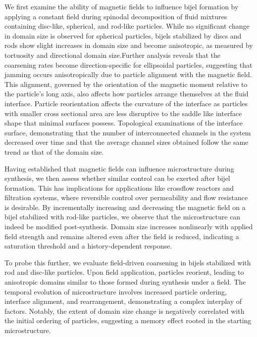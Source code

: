 \begin{front}
    We first examine the ability of magnetic fields to influence bijel formation by applying a constant field during spinodal decomposition 
    of fluid mixtures containing disc-like, spherical, and rod-like particles. While no significant change in domain size is observed for 
    spherical particles, bijels stabilized by discs and rods show slight increases in domain size and become anisotropic, as measured by 
    tortuosity and directional domain size.Further analysis reveals that the coarsening rates become direction-specific for ellipsoidal particles, 
    suggesting that jamming occurs anisotropically due to particle alignment with the magnetic field. This alignment, governed by the 
    orientation of the magnetic moment relative to the particle's long axis, also affects how particles arrange themselves at the fluid 
    interface. Particle reorientation affects the curvature of the interface as particles with smaller cross sectional area are less disruptive
    to the saddle like interface shape that minimal surfaces possess. Topological examinations of the interface surface, 
    demonstrating that the number of interconnected channels in the system decreased over time and that the average channel sizes obtained follow
    the same trend as that of the domain size.
    
    Having established that magnetic fields can influence microstructure during synthesis, we then assess whether similar control can be exerted 
    after bijel formation. This has implications for applications like crossflow reactors and filtration systems, where reversible control over 
    permeability and flow resistance is desirable. By incrementally increasing and decreasing the magnetic field on a bijel stabilized with 
    rod-like particles, we observe that the microstructure can indeed be modified post-synthesis. Domain size increases nonlinearly with 
    applied field strength and remains altered even after the field is reduced, indicating a saturation threshold and a history-dependent 
    response.
    
    To probe this further, we evaluate field-driven coarsening in bijels stabilized with rod and disc-like particles. Upon field application, 
    particles reorient, leading to anisotropic domains similar to those formed during synthesis under a field. The temporal evolution of 
    microstructure involves increased particle ordering, interface alignment, and rearrangement, demonstrating a complex interplay of factors. 
    Notably, the extent of domain size change is negatively correlated with the initial ordering of particles, suggesting a memory effect 
    rooted in the starting microstructure.
    

\end{front}
